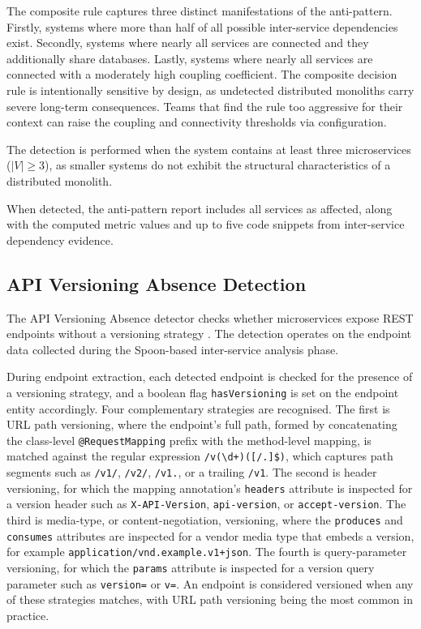 The composite rule captures three distinct manifestations of the anti-pattern. Firstly, systems where more than half of all possible inter-service dependencies exist. Secondly, systems where nearly all services are connected and they additionally share databases. Lastly, systems where nearly all services are connected with a moderately high coupling coefficient. The composite decision rule is intentionally sensitive by design, as undetected distributed monoliths carry severe long-term consequences. Teams that find the rule too aggressive for their context can raise the coupling and connectivity thresholds via configuration.

The detection is performed when the system contains at least three microservices ($|V| \geq 3$), as smaller systems do not exhibit the structural characteristics of a distributed monolith.

When detected, the anti-pattern report includes all services as affected, along with the computed metric values and up to five code snippets from inter-service dependency evidence.

\subsection{API Versioning Absence Detection}
\label{subsec:detect-versioning-absence}

\par The API Versioning Absence detector checks whether microservices expose REST endpoints without a versioning strategy \cite{Richardson2018}. The detection operates on the endpoint data collected during the Spoon-based inter-service analysis phase.

During endpoint extraction, each detected endpoint is checked for the presence of a versioning strategy, and a boolean flag \texttt{hasVersioning} is set on the endpoint entity accordingly. Four complementary strategies are recognised. The first is URL path versioning, where the endpoint's full path, formed by concatenating the class-level \texttt{@RequestMapping} prefix with the method-level mapping, is matched against the regular expression \texttt{/v(\textbackslash d+)([/.]\textbar\$)}, which captures path segments such as \texttt{/v1/}, \texttt{/v2/}, \texttt{/v1.}, or a trailing \texttt{/v1}. The second is header versioning, for which the mapping annotation's \texttt{headers} attribute is inspected for a version header such as \texttt{X-API-Version}, \texttt{api-version}, or \texttt{accept-version}. The third is media-type, or content-negotiation, versioning, where the \texttt{produces} and \texttt{consumes} attributes are inspected for a vendor media type that embeds a version, for example \texttt{application/vnd.example.v1+json}. The fourth is query-parameter versioning, for which the \texttt{params} attribute is inspected for a version query parameter such as \texttt{version=} or \texttt{v=}. An endpoint is considered versioned when any of these strategies matches, with URL path versioning being the most common in practice.

